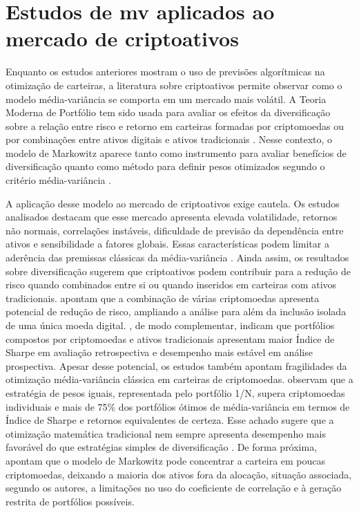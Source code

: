 

\section{Estudos de \acs{mv} aplicados ao mercado de criptoativos}
\label{sec_estudos_sobre_media_variancia_e_markowitz_em_criptoativos}

Enquanto os estudos anteriores mostram o uso de previsões algorítmicas na otimização de carteiras, a literatura sobre criptoativos permite observar como o modelo média-variância se comporta em um mercado mais volátil. A Teoria Moderna de Portfólio tem sido usada para avaliar os efeitos da diversificação sobre a relação entre risco e retorno em carteiras formadas por criptomoedas ou por combinações entre ativos digitais e ativos tradicionais \cite{brauneis2019cryptocurrency,jeleskovic2024cryptocurrency}. Nesse contexto, o modelo de Markowitz aparece tanto como instrumento para avaliar benefícios de diversificação quanto como método para definir pesos otimizados segundo o critério média-variância \cite{brauneis2019cryptocurrency,jeleskovic2024cryptocurrency}.

A aplicação desse modelo ao mercado de criptoativos exige cautela. Os estudos analisados destacam que esse mercado apresenta elevada volatilidade, retornos não normais, correlações instáveis, dificuldade de previsão da dependência entre ativos e sensibilidade a fatores globais. Essas características podem limitar a aderência das premissas clássicas da média-variância \cite{brauneis2019cryptocurrency,jeleskovic2024cryptocurrency,zouaoui2025portfolio}. Ainda assim, os resultados sobre diversificação sugerem que criptoativos podem contribuir para a redução de risco quando combinados entre si ou quando inseridos em carteiras com ativos tradicionais.  apontam que a combinação de várias criptomoedas apresenta potencial de redução de risco, ampliando a análise para além da inclusão isolada de uma única moeda digital. , de modo complementar, indicam que portfólios compostos por criptomoedas e ativos tradicionais apresentam maior Índice de Sharpe em avaliação retrospectiva e desempenho mais estável em análise prospectiva. Apesar desse potencial, os estudos também apontam fragilidades da otimização média-variância clássica em carteiras de criptomoedas.  observam que a estratégia de pesos iguais, representada pelo portfólio 1/N, supera criptomoedas individuais e mais de 75\% dos portfólios ótimos de média-variância em termos de Índice de Sharpe e retornos equivalentes de certeza. Esse achado sugere que a otimização matemática tradicional nem sempre apresenta desempenho mais favorável do que estratégias simples de diversificação \cite{brauneis2019cryptocurrency}. De forma próxima,  apontam que o modelo de Markowitz pode concentrar a carteira em poucas criptomoedas, deixando a maioria dos ativos fora da alocação, situação associada, segundo os autores, a limitações no uso do coeficiente de correlação e à geração restrita de portfólios possíveis.

